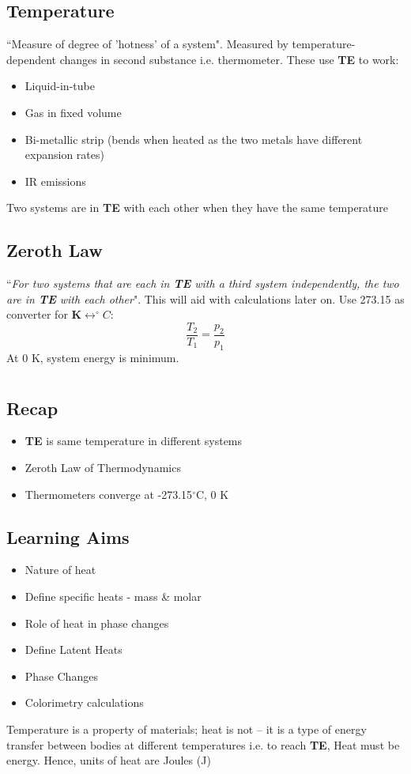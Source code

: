 \documentclass[a4paper, 11pt, normalem]{report}
\begin{document}
\section{Temperature}
``Measure of degree of 'hotness' of a system".
Measured by temperature-dependent changes in second substance i.e. thermometer.
These use \textbf{TE} to work:
\begin{itemize}
    \item Liquid-in-tube
    \item Gas in fixed volume
    \item Bi-metallic strip (bends when heated as the two metals have different expansion rates)
    \item IR emissions
\end{itemize}
Two systems are in \textbf{TE} with each other when they have the same temperature

\section{Zeroth Law}
``\textit{For two systems that are each in \textbf{TE} with a third system independently, the two are in \textbf{TE} with each other}".
This will aid with calculations later on.
Use 273.15 as converter for $\textbf{K}\leftrightarrow ^{\circ}C$:
\begin{equation}
    \dfrac{T_{2}}{T_{1}} = \dfrac{p_{2}}{p_{1}}
\end{equation}
At 0 K, system energy is minimum.

\chapter{}
\section{Recap}
\begin{itemize}
    \item \textbf{TE} is same temperature in different systems
    \item Zeroth Law of Thermodynamics
    \item Thermometers converge at -273.15{$^\circ$}C, 0 K
\end{itemize}

\section{Learning Aims}
\begin{itemize}
    \item Nature of heat
    \item Define specific heats - mass \& molar
    \item Role of heat in phase changes
    \item Define Latent Heats
    \item Phase Changes
    \item Colorimetry calculations
\end{itemize}
Temperature is a property of materials; heat is not -- it is a type of energy transfer between bodies at different temperatures i.e. to reach \textbf{TE},
Heat must be energy. Hence, units of heat are Joules (J)
\end{document}
